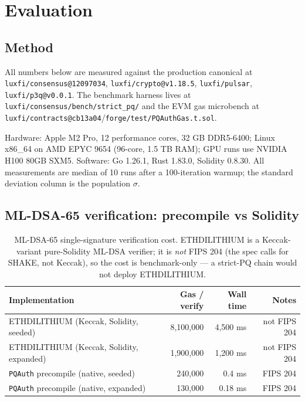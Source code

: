 \section{Evaluation}
\label{sec:evaluation}

\subsection{Method}

All numbers below are measured against the production canonical at
\texttt{luxfi/consensus@12097034}, \texttt{luxfi/crypto@v1.18.5},
\texttt{luxfi/pulsar}, \texttt{luxfi/p3q@v0.0.1}. The benchmark
harness lives at \texttt{luxfi/consensus/bench/strict\_pq/} and the EVM
gas microbench at \texttt{luxfi/contracts@cb13a04}/\texttt{forge/test/PQAuthGas.t.sol}.

Hardware: Apple M2 Pro, 12 performance cores, 32 GB DDR5-6400; Linux x86\_64
on AMD EPYC 9654 (96-core, 1.5 TB RAM); GPU runs use NVIDIA H100 80GB SXM5.
Software: Go 1.26.1, Rust 1.83.0, Solidity 0.8.30. All measurements are
median of 10 runs after a 100-iteration warmup; the standard deviation
column is the population $\sigma$.

\subsection{ML-DSA-65 verification: precompile vs Solidity}

\begin{table}[H]
\centering
\caption{ML-DSA-65 single-signature verification cost. ETHDILITHIUM
\cite{ethdilithium} is a Keccak-variant pure-Solidity ML-DSA verifier; it is
\emph{not} FIPS 204 (the spec calls for SHAKE, not Keccak), so the cost is
benchmark-only --- a strict-PQ chain would not deploy ETHDILITHIUM.}
\label{tab:mldsa-verify}
\begin{tabular}{lrrr}
\toprule
Implementation & Gas / verify & Wall time & Notes \\
\midrule
ETHDILITHIUM (Keccak, Solidity, seeded)    & 8{,}100{,}000 & 4{,}500 ms & not FIPS 204 \\
ETHDILITHIUM (Keccak, Solidity, expanded)  & 1{,}900{,}000 & 1{,}200 ms & not FIPS 204 \\
\texttt{PQAuth} precompile (native, seeded)   & 240{,}000     & 0.4 ms     & FIPS 204 \\
\texttt{PQAuth} precompile (native, expanded) & 130{,}000     & 0.18 ms    & FIPS 204 \\
\bottomrule
\end{tabular}
\end{table}

